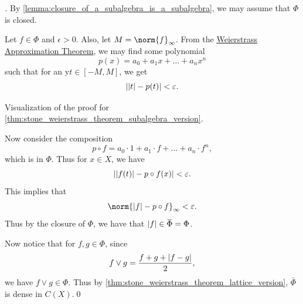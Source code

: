 \documentclass[notoc,notitlepage]{tufte-book}
\begin{document}
\begin{proof}[\vvimponote]
  By \cref{lemma:closure_of_a_subalgebra_is_a_subalgebra}, we may assume that $\Phi$ is closed.

  Let $f \in \Phi$ and $\epsilon > 0$. Also, let $M = \norm{f}_\infty$. From the \hyperref[thm:weierstrass_approximation_theorem]{Weierstrass Approximation Theorem}, we may find some polynomial
  \begin{equation*}
    p(x) = a_0 + a_1 x + \hdots + a_n x^n
  \end{equation*}
  such that for an y$t \in [-M, M]$, we get
  \begin{equation*}
    \left| \left| t \right| - p(t) \right| < \varepsilon.
  \end{equation*}
  \begin{marginfigure}
    \centering
    \caption{Visualization of the proof for \cref{thm:stone_weierstrass_theorem_subalgebra_version}.}\label{fig:visualization_of_the_proof_for_stone_weierstrass_theorem_subalgebra_version}
  \end{marginfigure}
  Now consider the composition
  \begin{equation*}
    p \circ f = a_0 \cdot 1 + a_1 \cdot f + \hdots + a_n \cdot f^n,
  \end{equation*}
  which is in $\Phi$. Thus for $x \in X$, we have
  \begin{equation*}
    \left| \left| f(t) \right| - p \circ f(x) \right| < \varepsilon.
  \end{equation*}
  This implies that
  \begin{equation*}
    \norm{ \abs{ f } - p \circ f }_\infty < \epsilon.
  \end{equation*}
  Thus by the closure of $\Phi$, we have that $\abs{ f } \in \bar{\Phi} = \Phi$.

  Now notice that for $f, g \in \Phi$, since
  \begin{equation*}
    f \lor g = \frac{f + g + \left| f - g \right|}{2},
  \end{equation*}
  we have $f \lor g \in \Phi$. Thus by \cref{thm:stone_weierstrass_theorem_lattice_version}, $\bar{\Phi}$ is dense in $C(X)$.\qed\
\end{proof}
\end{document}
